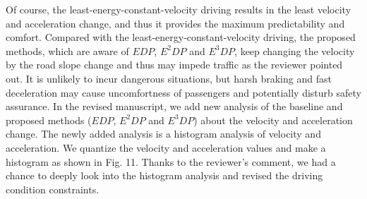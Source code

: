 \documentclass[onecolumn]{IEEEconf}
\begin{document}
\begin{description}
Of course, the least-energy-constant-velocity driving results in the least velocity and acceleration change, and thus it provides the maximum predictability and comfort. Compared with the least-energy-constant-velocity driving, the proposed methods, which are aware of $EDP$, $E^2DP$ and $E^3DP$, keep changing the velocity by the road slope change and thus may impede traffic as the reviewer pointed out. It is unlikely to incur dangerous situations, but harsh braking and fast deceleration may cause uncomfortness of passengers and potentially disturb safety assurance. In the revised manuscript, we add new analysis of the baseline and proposed methods ($EDP$, $E^2DP$ and $E^3DP$) about the velocity and acceleration change. The newly added analysis is a histogram analysis of velocity and acceleration. We quantize the velocity and acceleration values and make a histogram as shown in Fig. 11. Thanks to the reviewer’s comment, we had a chance to deeply look into the histogram analysis and revised the driving condition constraints. 



\end{description}
\end{document}
